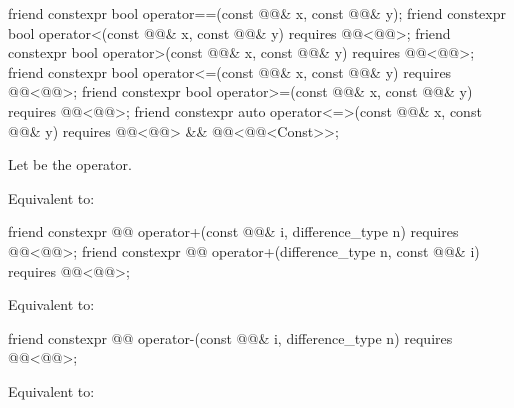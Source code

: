\begin{itemdecl}
friend constexpr bool operator==(const @@& x, const @@& y);
friend constexpr bool operator<(const @@& x, const @@& y)
  requires @@<@@>;
friend constexpr bool operator>(const @@& x, const @@& y)
  requires @@<@@>;
friend constexpr bool operator<=(const @@& x, const @@& y)
  requires @@<@@>;
friend constexpr bool operator>=(const @@& x, const @@& y)
  requires @@<@@>;
friend constexpr auto operator<=>(const @@& x, const @@& y)
  requires @@<@@> && @@<@@<Const>>;
\end{itemdecl}

\begin{itemdescr}
\pnum
Let  be the operator.

\pnum
\effects
Equivalent to: 
\end{itemdescr}

\begin{itemdecl}
friend constexpr @@ operator+(const @@& i, difference_type n)
  requires @@<@@>;
friend constexpr @@ operator+(difference_type n, const @@& i)
  requires @@<@@>;
\end{itemdecl}

\begin{itemdescr}
\pnum
\effects
Equivalent to: 
\end{itemdescr}

\begin{itemdecl}
friend constexpr @@ operator-(const @@& i, difference_type n)
  requires @@<@@>;
\end{itemdecl}

\begin{itemdescr}
\pnum
\effects
Equivalent to: 
\end{itemdescr}

